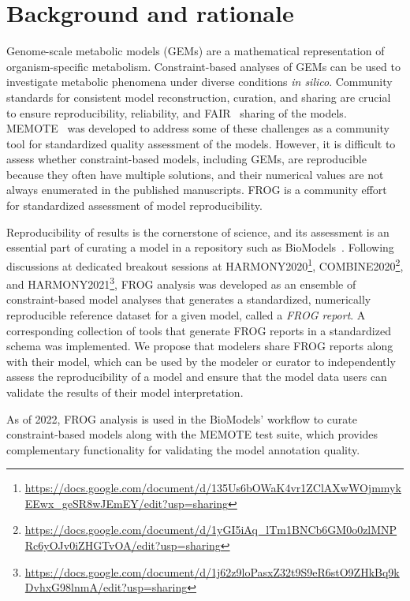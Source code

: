 \chapter{Background and rationale}

Genome-scale metabolic models (GEMs) are a mathematical representation of organism-specific metabolism.
Constraint-based analyses of GEMs can be used to investigate metabolic phenomena under diverse conditions \emph{in silico}.
Community standards for consistent model reconstruction, curation, and sharing are crucial to ensure reproducibility, reliability, and FAIR~\cite{stall2019make} sharing of the models.
MEMOTE~\cite{lieven2020memote} was developed to address some of these challenges as a community tool for standardized quality assessment of the models.
However, it is difficult to assess whether constraint-based models, including GEMs, are reproducible because they often have multiple solutions, and their numerical values are not always enumerated in the published manuscripts.
FROG is a community effort for standardized assessment of model reproducibility.

Reproducibility of results is the cornerstone of science, and its assessment is an essential part of curating a model in a repository such as BioModels~\cite{malik2020biomodels}.
Following discussions at dedicated breakout sessions at HARMONY2020\footnote{\url{https://docs.google.com/document/d/135Us6bOWaK4vr1ZClAXwWOjmmykEEwx_geSR8wJEmEY/edit?usp=sharing}}, COMBINE2020\footnote{\url{https://docs.google.com/document/d/1yGI5iAq_lTm1BNCb6GM0o0zlMNPRc6yOJv0iZHGTvOA/edit?usp=sharing}}, and HARMONY2021\footnote{\url{https://docs.google.com/document/d/1j62z9loPasxZ32t9S9eR6stO9ZHkBq9kDvhxG98lnmA/edit?usp=sharing}}, FROG analysis was developed as an ensemble of constraint-based model analyses that generates a standardized, numerically reproducible reference dataset for a given model, called a \emph{FROG report}.
A corresponding collection of tools that generate FROG reports in a standardized schema was implemented.
We propose that modelers share FROG reports along with their model, which can be used by the modeler or curator to independently assess the reproducibility of a model and ensure that the model data users can validate the results of their model interpretation.

As of 2022, FROG analysis is used in the BioModels' workflow to curate constraint-based models along with the MEMOTE test suite, which provides complementary functionality for validating the model annotation quality.

